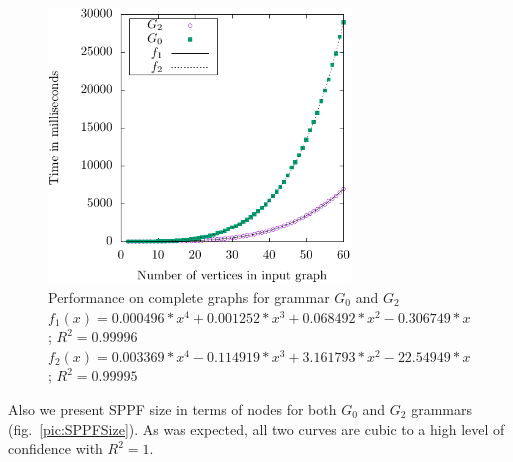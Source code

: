 \begin{figure}[ht]
\centering



 \includegraphics[width=8cm]{dot/grph1.pdf}
\caption{Performance on complete graphs for grammar $G_0$ and $G_2$ \\ 
$f_1(x) = 0.000496*x^4 + 0.001252*x^3 + 0.068492*x^2 - 0.306749*x$; $R^2 = 0.99996$ \\
$f_2(x) = 0.003369*x^4 - 0.114919*x^3 + 3.161793*x^2 - 22.54949*x$; $R^2 = 0.99995$}
\label{pic:Perf}
\end{figure}

Also we present SPPF size in terms of nodes for both $G_0$ and $G_2$ grammars (fig.~\ref{pic:SPPFSize}).
As was expected, all two curves are cubic to a high level of confidence with $R^2 = 1$. 

